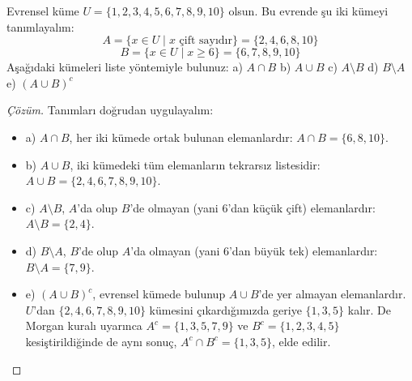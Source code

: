 \begin{example}
Evrensel küme $U = \{1, 2, 3, 4, 5, 6, 7, 8, 9, 10\}$ olsun. Bu evrende şu iki kümeyi tanımlayalım:
\[ A = \{x \in U \mid x \text{ çift sayıdır}\} = \{2, 4, 6, 8, 10\} \]
\[ B = \{x \in U \mid x \ge 6\} = \{6, 7, 8, 9, 10\} \]
Aşağıdaki kümeleri liste yöntemiyle bulunuz:
a) $A \cap B$ \quad b) $A \cup B$ \quad c) $A \setminus B$ \quad d) $B \setminus A$ \quad e) $(A \cup B)^c$
\end{example}
\begin{proof}[Çözüm]
Tanımları doğrudan uygulayalım:
\begin{itemize}
  \item a) $A \cap B$, her iki kümede ortak bulunan elemanlardır: $A \cap B = \{6, 8, 10\}$.
  \item b) $A \cup B$, iki kümedeki tüm elemanların tekrarsız listesidir: $A \cup B = \{2, 4, 6, 7, 8, 9, 10\}$.
  \item c) $A \setminus B$, $A$'da olup $B$'de olmayan (yani $6$'dan küçük çift) elemanlardır: $A \setminus B = \{2, 4\}$.
  \item d) $B \setminus A$, $B$'de olup $A$'da olmayan (yani $6$'dan büyük tek) elemanlardır: $B \setminus A = \{7, 9\}$.
  \item e) $(A \cup B)^c$, evrensel kümede bulunup $A \cup B$'de yer almayan elemanlardır. $U$'dan $\{2, 4, 6, 7, 8, 9, 10\}$ kümesini çıkardığımızda geriye $\{1, 3, 5\}$ kalır. De Morgan kuralı uyarınca $A^c = \{1, 3, 5, 7, 9\}$ ve $B^c = \{1, 2, 3, 4, 5\}$ kesiştirildiğinde de aynı sonuç, $A^c \cap B^c = \{1, 3, 5\}$, elde edilir.
\end{itemize}
\end{proof}

